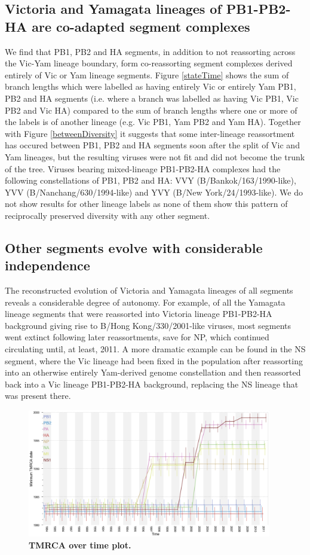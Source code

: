 \documentclass[11pt,oneside,letterpaper]{article}
\begin{document}
\subsection*{Victoria and Yamagata lineages of PB1-PB2-HA are co-adapted segment complexes}
We find that PB1, PB2 and HA segments, in addition to not reassorting across the Vic-Yam lineage boundary, form co-reassorting segment complexes derived entirely of Vic or Yam lineage segments.
Figure \ref{stateTime} shows the sum of branch lengths which were labelled as having entirely Vic or entirely Yam PB1, PB2 and HA segments (i.e. where a branch was labelled as having Vic PB1, Vic PB2 and Vic HA) compared to the sum of branch lengths where one or more of the labels is of another lineage (e.g. Vic PB1, Yam PB2 and Yam HA).
Together with Figure \ref{betweenDiversity} it suggests that some inter-lineage reassortment has occured between PB1, PB2 and HA segments soon after the split of Vic and Yam lineages, but the resulting viruses were not fit and did not become the trunk of the tree.
Viruses bearing mixed-lineage PB1-PB2-HA complexes had the following constellations of PB1, PB2 and HA: VVY (B/Bankok/163/1990-like), YVV (B/Nanchang/630/1994-like) and YVY (B/New York/24/1993-like).
We do not show results for other lineage labels as none of them show this pattern of reciprocally preserved diversity with any other segment.

\subsection*{Other segments evolve with considerable independence}
The reconstructed evolution of Victoria and Yamagata lineages of all segments reveals a considerable degree of autonomy.
For example, of all the Yamagata lineage segments that were reassorted into Victoria lineage PB1-PB2-HA background giving rise to B/Hong Kong/330/2001-like viruses, most segments went extinct following later reassortments, save for NP, which continued circulating until, at least, 2011.
A more dramatic example can be found in the NS segment, where the Vic lineage had been fixed in the population after reassorting into an otherwise entirely Yam-derived genome constellation and then reassorted back into a Vic lineage PB1-PB2-HA background, replacing the NS lineage that was present there. 

\begin{figure}[h]
	\centering		
	\includegraphics[width=0.95\textwidth]{figures/InfB_tmrcaOT_lines.png}
	\caption{\textbf{TMRCA over time plot.}}
	\label{tmrcaOT}
\end{figure}
\end{document}
